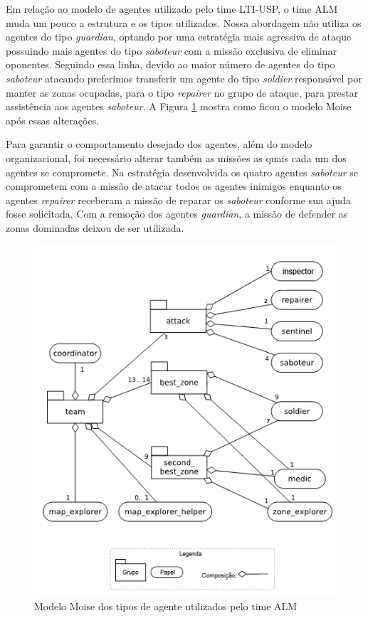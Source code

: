\documentclass{llncs}
\begin{document}
Em relação ao modelo de agentes utilizado pelo time LTI-USP, o time ALM muda um pouco a estrutura e os tipos utilizados. Nossa abordagem não utiliza os agentes do tipo \textit{guardian}, optando por uma estratégia mais agressiva de ataque possuindo mais agentes do tipo \textit{saboteur} com a missão exclusiva de eliminar oponentes. Seguindo essa linha, devido ao maior número de agentes do tipo \textit{saboteur} atacando preferimos transferir um agente do tipo \textit{soldier} responsável por manter as zonas ocupadas, para o tipo \textit{repairer} no grupo de ataque, para prestar assistência aos agentes \textit{saboteur}. A Figura \ref{fig:fig2} mostra como ficou o modelo Moise após essas alterações.

Para garantir o comportamento desejado dos agentes, além do modelo organizacional, foi necessário alterar também as missões as quais cada um dos agentes se compromete. Na estratégia desenvolvida os quatro agentes \textit{saboteur} se comprometem com a missão de atacar todos os agentes inimigos enquanto os agentes \textit{repairer} receberam a missão de reparar os \textit{saboteur} conforme sua ajuda fosse solicitada. Com a remoção dos agentes \textit{guardian}, a missão de defender as zonas dominadas deixou de ser utilizada.

\begin{figure}[!ht]
\centering
\includegraphics[width=0.7\linewidth]{./images/fig2.png}
\caption{Modelo Moise dos tipos de agente utilizados pelo time ALM}
\label{fig:fig2}
\end{figure}
\end{document}
